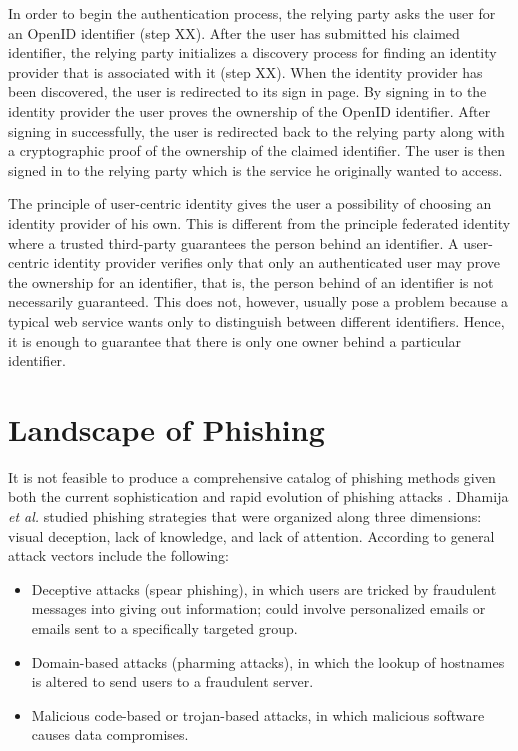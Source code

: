 \documentclass{tktltiki}
\begin{document}
     In order to begin the authentication process, the relying party asks the user for an OpenID identifier (step XX). After the user has submitted his claimed identifier, the relying party initializes a discovery process for finding an identity provider that is associated with it (step XX). When the identity provider has been discovered, the user is redirected to its sign in page. By signing in to the identity provider the user proves the ownership of the OpenID identifier. After signing in successfully, the user is redirected back to the relying party along with a cryptographic proof of the ownership of the claimed identifier. The user is then signed in to the relying party which is the service he originally wanted to access.

     The principle of user-centric identity gives the user a possibility of choosing an identity provider of his own. This is different from the principle federated identity where a trusted third-party guarantees the person behind an identifier. A user-centric identity provider verifies only that only an authenticated user may prove the ownership for an identifier, that is, the person behind of an identifier is not necessarily guaranteed. This does not, however, usually pose a problem because a typical web service wants only to distinguish between different identifiers. Hence, it is enough to guarantee that there is only one owner behind a particular identifier.

        
      
\section{Landscape of Phishing}

    It is not feasible to produce a comprehensive catalog of phishing methods given both the current sophistication and rapid evolution of phishing attacks \cite{phishing_attacks_and_solutions_2007}. Dhamija 
\emph{et al.} \cite{why_phishing_works_06} studied phishing strategies that were organized along three dimensions: visual deception, lack of knowledge, and lack of attention. According to \cite{phishing_attacks_and_solutions_2007, suspectibility_to_phishing_2006} general attack vectors include the following:

\begin{itemize}

  \item{Deceptive attacks (spear phishing),
            in which users are tricked by fraudulent messages into giving out
            information; could involve personalized emails or emails sent to a specifically 
            targeted group.
          }

  \item{Domain-based attacks (pharming attacks),
            in which the lookup of hostnames is altered to send users to a
            fraudulent server.
          }

  \item{Malicious code-based or trojan-based attacks,
              in which malicious software causes data compromises.
          }

\end{itemize}
\end{document}
